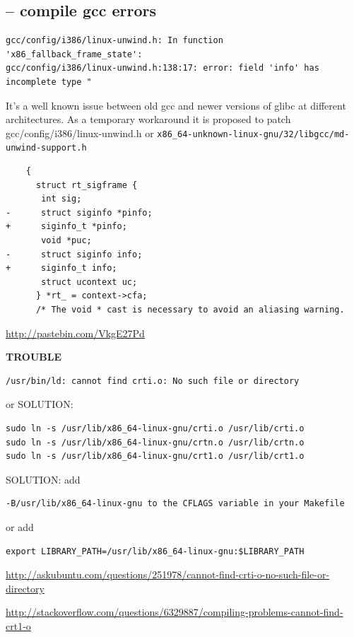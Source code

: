 \subsection{-- compile gcc errors}

{\tiny
\begin{verbatim}
gcc/config/i386/linux-unwind.h: In function 'x86_fallback_frame_state':
gcc/config/i386/linux-unwind.h:138:17: error: field 'info' has incomplete type " 
\end{verbatim}
}

It's a well known issue between old gcc and newer versions of glibc at different
architectures.
As a temporary workaround it is proposed to patch gcc/config/i386/linux-unwind.h
or \verb!x86_64-unknown-linux-gnu/32/libgcc/md-unwind-support.h!

\begin{verbatim}
    {
      struct rt_sigframe {
       int sig;
-      struct siginfo *pinfo;
+      siginfo_t *pinfo;
       void *puc;
-      struct siginfo info;
+      siginfo_t info;
       struct ucontext uc;
      } *rt_ = context->cfa;
      /* The void * cast is necessary to avoid an aliasing warning.
\end{verbatim}
\url{http://pastebin.com/VkgE27Pd}


{\bf TROUBLE}
\begin{verbatim}
/usr/bin/ld: cannot find crti.o: No such file or directory
\end{verbatim}
or SOLUTION:
\begin{verbatim}
sudo ln -s /usr/lib/x86_64-linux-gnu/crti.o /usr/lib/crti.o
sudo ln -s /usr/lib/x86_64-linux-gnu/crtn.o /usr/lib/crtn.o
sudo ln -s /usr/lib/x86_64-linux-gnu/crt1.o /usr/lib/crt1.o
\end{verbatim}

SOLUTION: add
\begin{verbatim}
-B/usr/lib/x86_64-linux-gnu to the CFLAGS variable in your Makefile
\end{verbatim}
or add 
\begin{verbatim}
export LIBRARY_PATH=/usr/lib/x86_64-linux-gnu:$LIBRARY_PATH
\end{verbatim}
\url{http://askubuntu.com/questions/251978/cannot-find-crti-o-no-such-file-or-directory} 

\url{http://stackoverflow.com/questions/6329887/compiling-problems-cannot-find-crt1-o}




